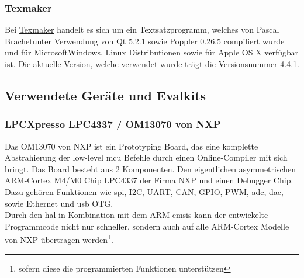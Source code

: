 \subsubsection*{Texmaker}
Bei \href{http://http://www.xm1math.net/texmaker/}{Texmaker} handelt es sich um ein Textsatzprogramm, welches von Pascal Brachet\SymbC unter Verwendung von Qt 5.2.1 sowie Poppler 0.26.5 compiliert wurde und für Microsoft\SymbC Windows\SymbReg, Linux Distributionen sowie für Apple OS X verfügbar ist. Die aktuelle Version, welche verwendet wurde trägt die Versionsnummer 4.4.1.

\subsection{Verwendete Geräte und Evalkits}
\subsubsection*{LPCXpresso LPC4337 / OM13070 von NXP}
Das OM13070 von NXP ist ein Prototyping Board, das eine komplette Abstrahierung der low-level \ac{mcu} Befehle durch einen Online-Compiler mit sich bringt. Das Board besteht aus 2 Komponenten. Den eigentlichen asymmetrischen ARM-Cortex M4/M0 Chip LPC4337 der Firma NXP und einen Debugger Chip. Dazu gehören Funktionen wie \ac{spi}, I2C, UART, CAN, GPIO, PWM, \ac{adc}, \ac{dac}, sowie Ethernet und \ac{usb} OTG.\\
Durch den \ac{hal} in Kombination mit dem ARM \ac{cmsis} kann der entwickelte Programmcode nicht nur schneller, sondern auch auf alle ARM-Cortex Modelle von NXP übertragen werden\footnote{sofern diese die programmierten Funktionen unterstützen}.

